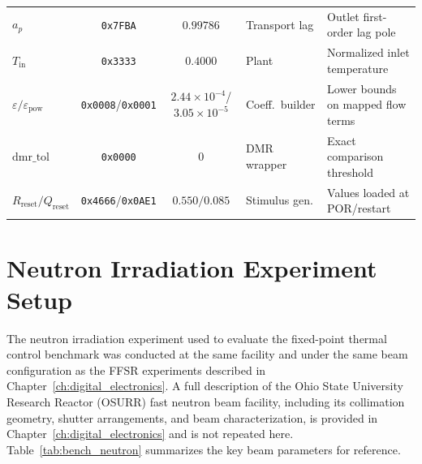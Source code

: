 \begin{table}[h!]
\begin{tabular}{@{} l c c l p{4.5cm} @{}}
    $a_p$              & \texttt{0x7FBA} & $0.99786$                 & Transport lag    & Outlet first-order lag pole \\
    $T_{\mathrm{in}}$  & \texttt{0x3333} & $0.4000$                  & Plant            & Normalized inlet temperature \\
    $\varepsilon/\varepsilon_{\mathrm{pow}}$ & \texttt{0x0008}/\texttt{0x0001} & $2.44\times10^{-4}$/$3.05\times10^{-5}$ & Coeff.\ builder & Lower bounds on mapped flow terms \\
    $\mathrm{dmr\_tol}$& \texttt{0x0000} & $0$                       & DMR wrapper      & Exact comparison threshold \\
    $R_{\mathrm{reset}}/Q_{\mathrm{reset}}$ & \texttt{0x4666}/\texttt{0x0AE1} & $0.550/0.085$ & Stimulus gen. & Values loaded at POR/restart \\
    \bottomrule
  \end{tabular}
\end{table}

\section{Neutron Irradiation Experiment Setup}
\label{sec:bench_neutron}

The neutron irradiation experiment used to evaluate the fixed-point
thermal control benchmark was conducted at the same facility and under
the same beam configuration as the FFSR experiments described in
Chapter~\ref{ch:digital_electronics}.  A full description of the Ohio State
University Research Reactor (OSURR) fast neutron beam facility,
including its collimation geometry, shutter arrangements, and beam
characterization, is provided in Chapter~\ref{ch:digital_electronics} and is not
repeated here.  Table~\ref{tab:bench_neutron} summarizes the key beam
parameters for reference.

